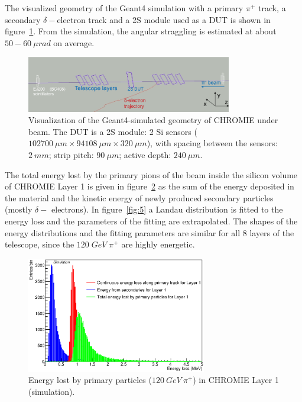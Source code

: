 \documentclass[a4paper,11pt]{article}
\begin{document}
The visualized geometry of the Geant4 simulation with a primary $\pi^{+}$ track, a secondary $\delta -$electron track and a 2S module used as a DUT is shown in figure~\ref{fig:3}. From the simulation, the angular straggling is estimated at about $50-60\: \mu rad$ on average.

\begin{figure}[htbp]
	\centering %
	\includegraphics[width=0.8\textwidth,origin=c,angle=0]{visualization.png}
	\caption{\label{fig:3} Visualization of the Geant4-simulated geometry of CHROMIE under beam. The DUT is a 2S module: 2 Si sensors ($102700\: \mu m \times 94108\: \mu m \times 320\: \mu m$), with spacing between the sensors: $2\: mm$; strip pitch: $90\: \mu m$; active depth:  $240\: \mu m$.}
\end{figure}

The total energy lost by the primary pions of the beam inside the silicon volume of CHROMIE Layer 1 is given in figure~\ref{fig:4} as the sum of the energy deposited in the material and the kinetic energy of newly produced secondary particles (mostly $\delta -$ electrons). In figure~\ref{fig:5} a Landau distribution is fitted to the energy loss and the parameters of the fitting are extrapolated. The shapes of the energy distributions and the fitting parameters are similar for all 8 layers of the telescope, since the $120\; GeV\; \pi^{+}$ are highly energetic.

\begin{figure}[htbp]
	\centering %
	\includegraphics[width=0.7\textwidth,origin=c,angle=0]{energy_layer_1.eps}
	\caption{\label{fig:4} Energy lost by primary particles ($120\: GeV\: \pi^{+}$) in CHROMIE Layer 1 (simulation).}
\end{figure}
\end{document}
